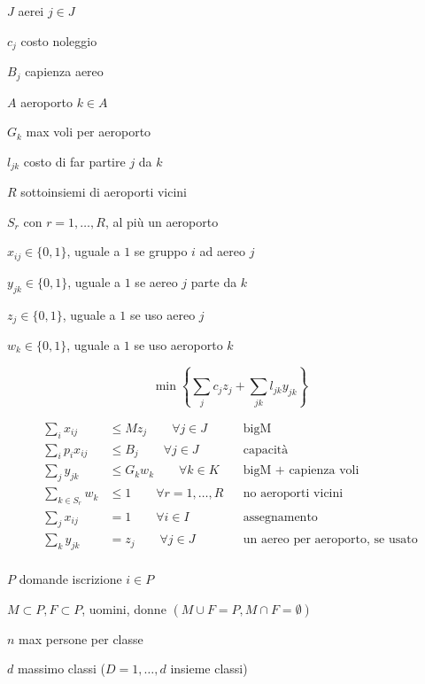$J$ aerei $j\in J$

$c_{j}$ costo noleggio

$B_{j}$ capienza aereo

$A$ aeroporto $k\in A$

$G_{k}$ max voli per aeroporto

$l_{jk}$ costo di far partire $j$ da $k$

$R$ sottoinsiemi di aeroporti vicini

$S_{r}$ con $r=1,\dotsc ,R$, al più un aeroporto

\Var

$x_{ij} \in \{0,1\}$, uguale a $1$ se gruppo $i$ ad aereo $j$

$y_{jk} \in \{0,1\}$, uguale a $1$ se aereo $j$ parte da $k$

$z_{j} \in \{0,1\}$, uguale a $1$ se uso aereo $j$

$w_{k} \in \{0,1\}$, uguale a $1$ se uso aeroporto $k$

\Fob

\begin{equation*}
	\min\left\{\sum _{j} c_{j} z_{j} +\sum _{jk} l_{jk} y_{jk}\right\}
\end{equation*}

\Vin

\begin{align*}
	\sum _{i} x_{ij} &\leq Mz_{j} \qquad\forall j\in J && \text{bigM} \\
	\sum _{i} p_{i} x_{ij} &\leq B_{j} \qquad\forall j\in J && \text{capacità} \\
	\sum _{j} y_{jk} &\leq G_{k} w_{k} \qquad\forall k\in K && \text{bigM + capienza voli} \\
	\sum _{k\in S_{r}} w_{k} &\leq 1\qquad\forall r=1,\dotsc ,R && \text{no aeroporti vicini} \\
	\sum _{j} x_{ij} &=1\qquad\forall i\in I && \text{assegnamento} \\
	\sum _{k} y_{jk} &=z_{j} \qquad\forall j\in J && \text{un aereo per aeroporto, se usato} \\
\end{align*}

\Es

\Par

$P$ domande iscrizione $i\in P$

$M\subset P,F\subset P$, uomini, donne $( M\cup F=P,M\cap F=\emptyset )$

$n$ max persone per classe

$d$ massimo classi ($D=1,\dotsc ,d$ insieme classi)

